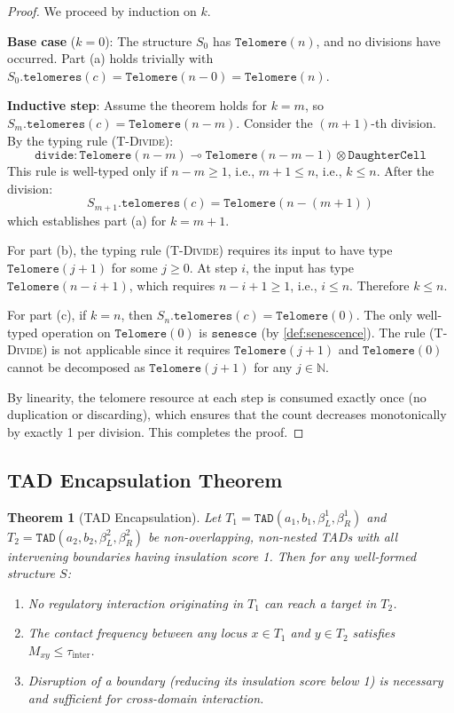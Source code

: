 \documentclass[12pt,a4paper]{article}
\theoremstyle{plain}
\newtheorem{theorem}{Theorem}[section]
\theoremstyle{definition}
\begin{document}
\begin{proof}
We proceed by induction on $k$.

\textbf{Base case} ($k = 0$): The structure $S_0$ has $\texttt{Telomere}(n)$, and no divisions have occurred. Part (a) holds trivially with $S_0.\texttt{telomeres}(c) = \texttt{Telomere}(n - 0) = \texttt{Telomere}(n)$.

\textbf{Inductive step}: Assume the theorem holds for $k = m$, so $S_m.\texttt{telomeres}(c) = \texttt{Telomere}(n - m)$. Consider the $(m+1)$-th division. By the typing rule (\textsc{T-Divide}):
\[
  \texttt{divide} : \texttt{Telomere}(n - m) \multimap \texttt{Telomere}(n - m - 1) \otimes \texttt{DaughterCell}
\]
This rule is well-typed only if $n - m \geq 1$, i.e., $m + 1 \leq n$, i.e., $k \leq n$. After the division:
\[
  S_{m+1}.\texttt{telomeres}(c) = \texttt{Telomere}(n - (m+1))
\]
which establishes part (a) for $k = m + 1$.

For part (b), the typing rule (\textsc{T-Divide}) requires its input to have type $\texttt{Telomere}(j+1)$ for some $j \geq 0$. At step $i$, the input has type $\texttt{Telomere}(n - i + 1)$, which requires $n - i + 1 \geq 1$, i.e., $i \leq n$. Therefore $k \leq n$.

For part (c), if $k = n$, then $S_n.\texttt{telomeres}(c) = \texttt{Telomere}(0)$. The only well-typed operation on $\texttt{Telomere}(0)$ is $\texttt{senesce}$ (by \cref{def:senescence}). The rule (\textsc{T-Divide}) is not applicable since it requires $\texttt{Telomere}(j+1)$ and $\texttt{Telomere}(0)$ cannot be decomposed as $\texttt{Telomere}(j+1)$ for any $j \in \mathbb{N}$.

By linearity, the telomere resource at each step is consumed exactly once (no duplication or discarding), which ensures that the count decreases monotonically by exactly 1 per division. This completes the proof.
\end{proof}

\subsection{TAD Encapsulation Theorem}

\begin{theorem}[TAD Encapsulation]\label{thm:tad-encapsulation}
Let $T_1 = \texttt{TAD}(a_1, b_1, \beta_L^1, \beta_R^1)$ and $T_2 = \texttt{TAD}(a_2, b_2, \beta_L^2, \beta_R^2)$ be non-overlapping, non-nested TADs with all intervening boundaries having insulation score 1. Then for any well-formed structure $S$:
\begin{enumerate}[label=(\alph*)]
  \item No regulatory interaction originating in $T_1$ can reach a target in $T_2$.
  \item The contact frequency between any locus $x \in T_1$ and $y \in T_2$ satisfies $M_{xy} \leq \tau_{\text{inter}}$.
  \item Disruption of a boundary (reducing its insulation score below 1) is necessary and sufficient for cross-domain interaction.
\end{enumerate}
\end{theorem}
\end{document}
